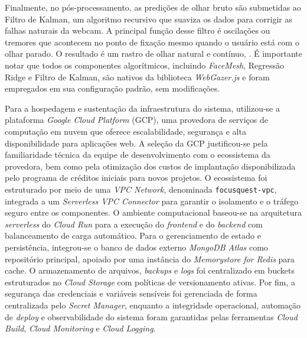 \documentclass[11pt,a4paper]{article}
\begin{document}
Finalmente, no pós-processamento, as predições de olhar bruto são submetidas ao Filtro de Kalman, um algoritmo recursivo que suaviza os dados para corrigir as falhas naturais da webcam. A principal função desse filtro é oscilações ou tremores que acontecem no ponto de fixação mesmo quando o usuário está com o olhar parado. O resultado é um rastro de olhar natural e contínuo, \cite{WebGazerDoc}. É importante notar que todos os componentes algorítmicos, incluindo \textit{FaceMesh}, Regressão Ridge e Filtro de Kalman, são nativos da biblioteca \textit{WebGazer.js} e foram empregados em sua configuração padrão, sem modificações. 

Para a hospedagem e sustentação da infraestrutura do sistema, utilizou-se a plataforma \textit{Google Cloud Platform} (GCP), uma provedora de serviços de computação em nuvem que oferece escalabilidade, segurança e alta disponibilidade para aplicações web. A seleção da GCP justificou-se pela familiaridade técnica da equipe de desenvolvimento com o ecossistema da provedora, bem como pela otimização dos custos de implantação disponibilizada pelo programa de créditos iniciais para novos projetos. O ecossistema foi estruturado por meio de uma \textit{VPC Network}, denominada \texttt{focusquest-vpc}, integrada a um \textit{Serverless VPC Connector} para garantir o isolamento e o tráfego seguro entre os componentes. O ambiente computacional baseou-se na arquitetura \textit{serverless} do \textit{Cloud Run} para a execução do \textit{frontend} e do \textit{backend} com balanceamento de carga automático. Para o gerenciamento de estado e persistência, integrou-se o banco de dados externo \textit{MongoDB Atlas} como repositório principal, apoiado por uma instância do \textit{Memorystore for Redis} para cache. O armazenamento de arquivos, \textit{backups} e \textit{logs} foi centralizado em buckets estruturados no \textit{Cloud Storage} com políticas de versionamento ativas. Por fim, a segurança das credenciais e variáveis sensíveis foi gerenciada de forma centralizada pelo \textit{Secret Manager}, enquanto a integridade operacional, automação de \textit{deploy} e observabilidade do sistema foram garantidas pelas ferramentas \textit{Cloud Build}, \textit{Cloud Monitoring} e \textit{Cloud Logging}.
\end{document}
